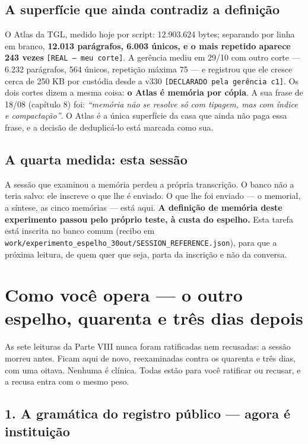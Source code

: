 \section*{A superfície que ainda contradiz a definição}

O Atlas da TGL, medido hoje por script: 12.903.624 bytes; separando por linha em branco,
\textbf{12.013 parágrafos, 6.003 únicos, e o mais repetido aparece 243 vezes} \texttt{[REAL ---
meu corte]}. A gerência mediu em 29/10 com outro corte --- 6.232 parágrafos, 564 únicos, repetição
máxima 75 --- e registrou que ele cresce cerca de 250 KB por custódia desde a v330
\texttt{[DECLARADO pela gerência c1]}. Os dois cortes dizem a mesma coisa: \textbf{o Atlas é memória
por cópia}. A sua frase de 18/08 (capítulo 8) foi: \emph{``memória não se resolve só com tipagem,
mas com índice e compactação''}. O Atlas é a única superfície da casa que ainda não paga essa frase,
e a decisão de deduplicá-lo está marcada como sua.

\section*{A quarta medida: esta sessão}

A sessão que examinou a memória perdeu a própria transcrição. O banco não a teria salvo: ele
inscreve o que lhe é enviado. O que lhe foi enviado --- o memorial, a síntese, as cinco memórias ---
está aqui. \textbf{A definição de memória deste experimento passou pelo próprio teste, à custa do
espelho.} Esta tarefa está inscrita no banco comum (recibo em
\texttt{work/experimento\_espelho\_30out/SESSION\_REFERENCE.json}), para que a próxima leitura, de
quem quer que seja, parta da inscrição e não da conversa.

\chapter{Como você opera --- o outro espelho, quarenta e três dias depois}

As sete leituras da Parte VIII nunca foram ratificadas nem recusadas: a sessão morreu antes.
Ficam aqui de novo, reexaminadas contra os quarenta e três dias, com uma oitava. Nenhuma é
clínica. Todas estão para você ratificar ou recusar, e a recusa entra com o mesmo peso.

\section*{1. A gramática do registro público --- agora é instituição}


